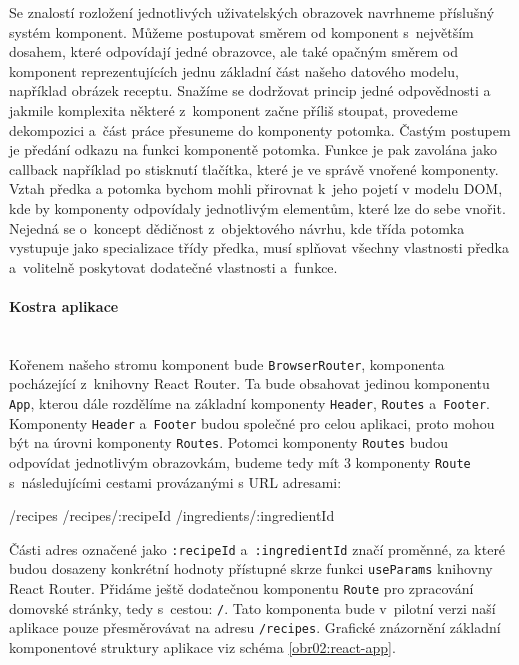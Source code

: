 Se znalostí rozložení jednotlivých uživatelských obrazovek navrhneme příslušný systém komponent. Můžeme postupovat směrem od komponent s~největším dosahem, které odpovídají jedné obrazovce, ale také opačným směrem od komponent reprezentujících jednu základní část našeho datového modelu, například obrázek receptu. Snažíme se dodržovat princip jedné odpovědnosti a jakmile komplexita některé z~komponent začne příliš stoupat, provedeme dekompozici a~část práce přesuneme do komponenty potomka. Častým postupem je předání odkazu na funkci komponentě potomka. Funkce je pak zavolána jako callback například po stisknutí tlačítka, které je ve správě vnořené komponenty. Vztah předka a potomka bychom mohli přirovnat k~jeho pojetí v modelu DOM, kde by komponenty odpovídaly jednotlivým elementům, které lze do sebe vnořit. Nejedná se o~koncept dědičnost z~objektového návrhu, kde třída potomka vystupuje jako specializace třídy předka, musí splňovat všechny vlastnosti předka a~volitelně poskytovat dodatečné vlastnosti a~funkce.

\paragraph{Kostra aplikace}\mbox{}\\

Kořenem našeho stromu komponent bude \texttt{BrowserRouter}, komponenta pocházející z~knihovny React Router. Ta bude obsahovat jedinou komponentu \texttt{App}, kterou dále rozdělíme na základní komponenty \texttt{Header}, \texttt{Routes} a~\texttt{Footer}. Komponenty \texttt{Header} a~\texttt{Footer} budou společné pro celou aplikaci, proto mohou být na úrovni komponenty \texttt{Routes}. Potomci komponenty \texttt{Routes} budou odpovídat jednotlivým obrazovkám, budeme tedy mít $3$ komponenty \texttt{Route} s~následujícími cestami provázanými s URL adresami:

\begin{code}
/recipes
/recipes/:recipeId
/ingredients/:ingredientId
\end{code}

Části adres označené jako \texttt{:recipeId} a~\texttt{:ingredientId} značí proměnné, za které budou dosazeny konkrétní hodnoty přístupné skrze funkci \texttt{useParams} kni\-hovny React Router. Přidáme ještě dodatečnou komponentu \texttt{Route} pro zpracování domovské stránky, tedy s~cestou: \texttt{/}. Tato komponenta bude v~pilotní verzi naší aplikace pouze přesměrovávat na adresu \texttt{/recipes}. Grafické znázornění základní komponentové struktury aplikace viz schéma \ref{obr02:react-app}.

